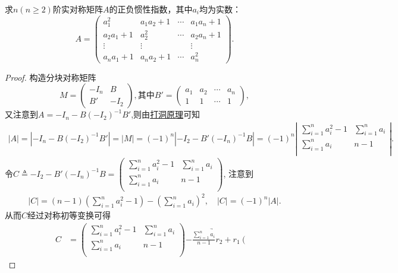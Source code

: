 \documentclass[../../main.tex]{subfiles}
\begin{document}
\begin{proposition}
求\(n(n\geq2)\)阶实对称矩阵\(A\)的正负惯性指数，其中\(a_i\)均为实数：
\[
A = \begin{pmatrix}
a_1^2 & a_1a_2 + 1 & \cdots & a_1a_n + 1 \\
a_2a_1 + 1 & a_2^2 & \cdots & a_2a_n + 1 \\
\vdots & \vdots & & \vdots \\
a_na_1 + 1 & a_na_2 + 1 & \cdots & a_n^2
\end{pmatrix}.
\]
\end{proposition} 
\begin{proof}
构造分块对称矩阵
\[
M = \begin{pmatrix}
-I_n & B \\
B' & -I_2
\end{pmatrix}, \text{其中} B' = \begin{pmatrix}
a_1 & a_2 & \cdots & a_n \\
1 & 1 & \cdots & 1
\end{pmatrix},
\]
又注意到$A=-I_n-B(-I_2)^{-1}B'$,则由\hyperref[proposition:打洞原理]{打洞原理}可知
\begin{align*}
\left| A \right|=\left| -I_n-B(-I_2)^{-1}B' \right|=\left| M \right|=\left( -1 \right) ^n\left| -I_2-B' (-I_n)^{-1}B \right|=\left( -1 \right) ^n\left| \begin{matrix}
\sum_{i=1}^n{a_{i}^{2}}-1&		\sum_{i=1}^n{a_i}\\
\sum_{i=1}^n{a_i}&		n-1\\
\end{matrix} \right|.
\end{align*}
令$C\triangleq -I_2-B' (-I_n)^{-1}B=\left( \begin{matrix}
\sum_{i=1}^n{a_{i}^{2}}-1&		\sum_{i=1}^n{a_i}\\
\sum_{i=1}^n{a_i}&		n-1\\
\end{matrix} \right) $,
注意到
\begin{align*}
|C|=\left( n-1 \right) \left( \sum_{i=1}^n{a_{i}^{2}}-1 \right) -\left( \sum_{i=1}^n{a_i} \right) ^2,\quad |C|=(-1)^n|A|.
\end{align*}
从而$C$经过对称初等变换可得
\begin{align*}
C&=\left( \begin{matrix}
\sum_{i=1}^n{a_{i}^{2}}-1&		\sum_{i=1}^n{a_i}\\
\sum_{i=1}^n{a_i}&		n-1\\
\end{matrix} \right) \underrightarrow{-\frac{\sum\limits_{i=1}^n{a_i}}{n-1}r_2+r_1}\left( \begin{matrix}

\end{matrix}
\end{align*}
\end{proof}
\end{document}
